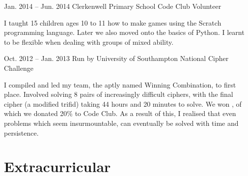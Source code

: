 \documentclass{tccv}
\begin{document}
\begin{eventlist}
        \item{Jan. 2014 -- Jun. 2014}
             {Clerkenwell Primary School}
             {Code Club Volunteer}
        
        I taught 15 children ages 10 to 11 how to make games using the Scratch programming language. Later we also moved onto the basics of Python. I learnt to be flexible when dealing with groups of mixed ability.
        
        \item{Oct. 2012 -- Jan. 2013}
             {Run by University of Southampton}
             {National Cipher Challenge}
             
        I compiled and led my team, the aptly named Winning Combination, to first place. Involved solving 8 pairs of increasingly difficult ciphers, with the final cipher (a modified trifid) taking 44 hours and 20 minutes to solve. We won , of which we donated 20\% to Code Club. As a result of this, I realised that even problems which seem insurmountable, can eventually be solved with time and persistence. 
    
    \end{eventlist}


\vfill

\section{Extracurricular}
\end{document}
